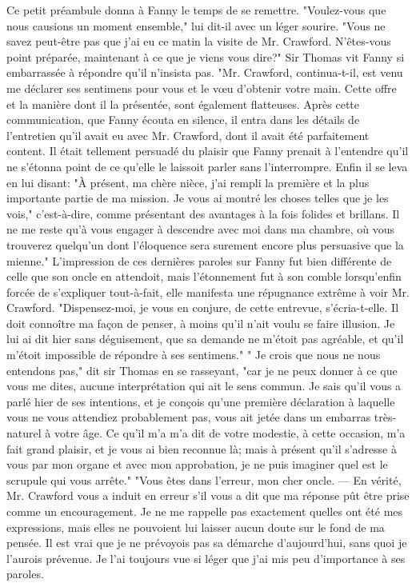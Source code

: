 Ce petit préambule donna à Fanny le temps de se remettre.
"Voulez-vous que nous causions un moment ensemble," lui dit-il avec un léger sourire. "Vous ne savez peut-être pas que j'ai eu ce matin la visite de Mr. Crawford. N'êtes-vous point préparée, maintenant à ce que je viens vous dire?"
Sir Thomas vit Fanny si embarrassée à répondre qu'il n'insista pas. "Mr. Crawford, continua-t-il, est venu me déclarer ses sentimens pour vous et le vœu d'obtenir votre main. Cette offre et la manière dont il la présentée, sont également flatteuses. Après cette communication, que Fanny écouta en silence, il entra dans les détails de l'entretien qu'il avait eu avec Mr. Crawford, dont il avait été parfaitement content. Il était tellement persuadé du plaisir que Fanny prenait à l'entendre qu'il ne s'étonna point de ce qu'elle le laissoit parler sans l'interrompre. Enfin il se leva en lui disant: "À présent, ma chère nièce, j'ai rempli la première et la plus importante partie de ma mission. Je vous ai montré les choses telles que je les vois,"\setcounter{page}{266} c'est-à-dire, comme présentant des avantages à la fois folides et brillans. Il ne me reste qu'à vous engager à descendre avec moi dans ma chambre, où vous trouverez quelqu'un dont l'éloquence sera surement encore plus persuasive que la mienne."
L'impression de ces dernières paroles sur Fanny fut bien différente de celle que son oncle en attendoit, mais l'étonnement fut à son comble lorsqu'enfin forcée de s'expliquer tout-à-fait, elle manifesta une répugnance extrême à voir Mr. Crawford. "Dispensez-moi, je vous en conjure, de cette entrevue, s'écria-t-elle. Il doit connoître ma façon de penser, à moins qu'il n'ait voulu se faire illusion. Je lui ai dit hier sans déguisement, que sa demande ne m'étoit pas agréable, et qu'il m'étoit impossible de répondre à ses sentimens."
" Je crois que nous ne nous entendons pas," dit sir Thomas en se rasseyant, "car je ne peux donner à ce que vous me dites, aucune interprétation qui ait le sens commun. Je sais qu'il vous a parlé hier de ses intentions, et je conçois qu'une première déclaration à laquelle vous ne vous attendiez probablement pas, vous ait jetée dans un embarras très-naturel à votre âge. Ce qu'il m'a\setcounter{page}{267} m'a dit de votre modestie, à cette occasion, m'a fait grand plaisir, et je vous ai bien reconnue là; mais à présent qu'il s'adresse à vous par mon organe et avec mon approbation, je ne puis imaginer quel est le scrupule qui vous arrête."
"Vous êtes dans l'erreur, mon cher oncle.
— En vérité, Mr. Crawford vous a induit en erreur s'il vous a dit que ma réponse pût être prise comme un encouragement. Je ne me rappelle pas exactement quelles ont été mes expressions, mais elles ne pouvoient lui laisser aucun doute sur le fond de ma pensée. Il est vrai que je ne prévoyois pas sa démarche d'aujourd'hui, sans quoi je l'aurois prévenue. Je l'ai toujours vue si léger que j'ai mis peu d'importance à ses paroles.
